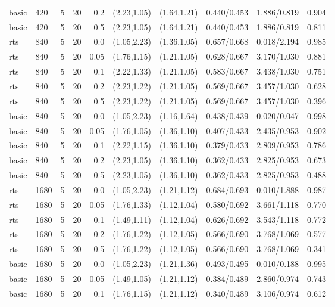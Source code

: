 \begin{tabular}{llrrrccccc}
basic & 420 & 5 & 20 & 0.2 & (2.23,1.05) & (1.64,1.21) & 0.440/0.453 & 1.886/0.819 & 0.904 \\
basic & 420 & 5 & 20 & 0.5 & (2.23,1.05) & (1.64,1.21) & 0.440/0.453 & 1.886/0.819 & 0.811 \\
rts & 840 & 5 & 20 & 0.0 & (1.05,2.23) & (1.36,1.05) & 0.657/0.668 & 0.018/2.194 & 0.985 \\
rts & 840 & 5 & 20 & 0.05 & (1.76,1.15) & (1.21,1.05) & 0.628/0.667 & 3.170/1.030 & 0.881 \\
rts & 840 & 5 & 20 & 0.1 & (2.22,1.33) & (1.21,1.05) & 0.583/0.667 & 3.438/1.030 & 0.751 \\
rts & 840 & 5 & 20 & 0.2 & (2.23,1.22) & (1.21,1.05) & 0.569/0.667 & 3.457/1.030 & 0.628 \\
rts & 840 & 5 & 20 & 0.5 & (2.23,1.22) & (1.21,1.05) & 0.569/0.667 & 3.457/1.030 & 0.396 \\
basic & 840 & 5 & 20 & 0.0 & (1.05,2.23) & (1.16,1.64) & 0.438/0.439 & 0.020/0.047 & 0.998 \\
basic & 840 & 5 & 20 & 0.05 & (1.76,1.05) & (1.36,1.10) & 0.407/0.433 & 2.435/0.953 & 0.902 \\
basic & 840 & 5 & 20 & 0.1 & (2.22,1.15) & (1.36,1.10) & 0.379/0.433 & 2.809/0.953 & 0.786 \\
basic & 840 & 5 & 20 & 0.2 & (2.23,1.05) & (1.36,1.10) & 0.362/0.433 & 2.825/0.953 & 0.673 \\
basic & 840 & 5 & 20 & 0.5 & (2.23,1.05) & (1.36,1.10) & 0.362/0.433 & 2.825/0.953 & 0.488 \\
rts & 1680 & 5 & 20 & 0.0 & (1.05,2.23) & (1.21,1.12) & 0.684/0.693 & 0.010/1.888 & 0.987 \\
rts & 1680 & 5 & 20 & 0.05 & (1.76,1.33) & (1.12,1.04) & 0.580/0.692 & 3.661/1.118 & 0.770 \\
rts & 1680 & 5 & 20 & 0.1 & (1.49,1.11) & (1.12,1.04) & 0.626/0.692 & 3.543/1.118 & 0.772 \\
rts & 1680 & 5 & 20 & 0.2 & (1.76,1.22) & (1.12,1.05) & 0.566/0.690 & 3.768/1.069 & 0.577 \\
rts & 1680 & 5 & 20 & 0.5 & (1.76,1.22) & (1.12,1.05) & 0.566/0.690 & 3.768/1.069 & 0.341 \\
basic & 1680 & 5 & 20 & 0.0 & (1.05,2.23) & (1.21,1.36) & 0.493/0.495 & 0.010/0.188 & 0.995 \\
basic & 1680 & 5 & 20 & 0.05 & (1.49,1.05) & (1.21,1.12) & 0.384/0.489 & 2.860/0.974 & 0.743 \\
basic & 1680 & 5 & 20 & 0.1 & (1.76,1.15) & (1.21,1.12) & 0.340/0.489 & 3.106/0.974 & 0.612 \\

\end{tabular}
